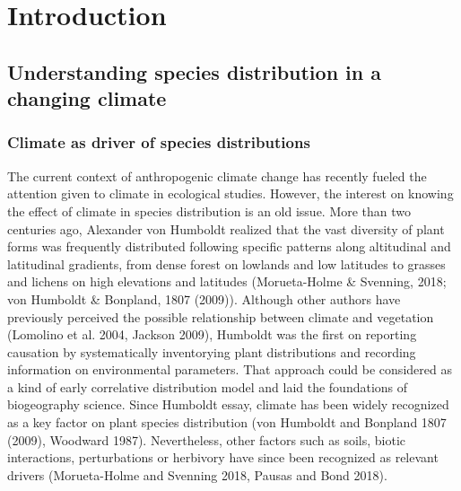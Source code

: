 \documentclass[11pt,twoside]{reedthesis}
\begin{document}
\captionsetup[figure]{font=small} \setlength{\parindent}{30pt}
\setlength{\parskip}{0.2cm plus4mm minus3mm}

\chapter{Introduction}\label{introduction}

\newpage

\section{Understanding species distribution in a changing
climate}\label{understanding-species-distribution-in-a-changing-climate}

\subsection{Climate as driver of species
distributions}\label{climate-as-driver-of-species-distributions}

The current context of anthropogenic climate change has recently fueled
the attention given to climate in ecological studies. However, the
interest on knowing the effect of climate in species distribution is an
old issue. More than two centuries ago, Alexander von Humboldt realized
that the vast diversity of plant forms was frequently distributed
following specific patterns along altitudinal and latitudinal gradients,
from dense forest on lowlands and low latitudes to grasses and lichens
on high elevations and latitudes (Morueta-Holme \& Svenning, 2018; von
Humboldt \& Bonpland, 1807 (2009)). Although other authors have
previously perceived the possible relationship between climate and
vegetation (Lomolino et al. 2004, Jackson 2009), Humboldt was the first
on reporting causation by systematically inventorying plant
distributions and recording information on environmental parameters.
That approach could be considered as a kind of early correlative
distribution model and laid the foundations of biogeography science.
Since Humboldt essay, climate has been widely recognized as a key factor
on plant species distribution (von Humboldt and Bonpland 1807 (2009),
Woodward 1987). Nevertheless, other factors such as soils, biotic
interactions, perturbations or herbivory have since been recognized as
relevant drivers (Morueta-Holme and Svenning 2018, Pausas and Bond
2018). \par
\end{document}
